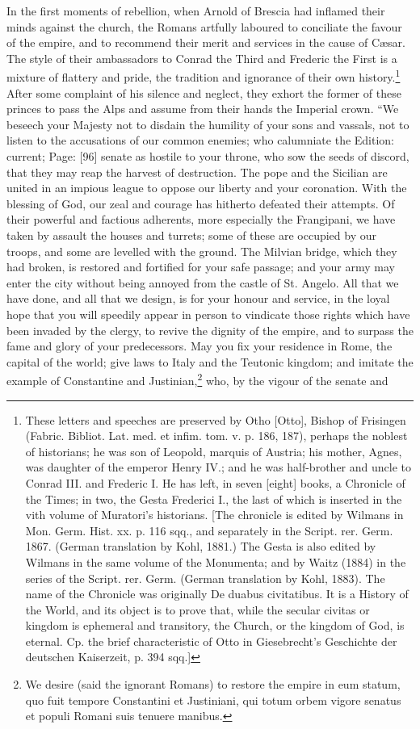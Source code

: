 In the first moments of rebellion, when Arnold of Brescia had inflamed their minds against the church, the Romans artfully laboured to conciliate the favour of the empire, and to recommend their merit and services in the cause of Cæsar. The style of their ambassadors to Conrad the Third and Frederic the First is a mixture of flattery and pride, the tradition and ignorance of their own history.\footnote{These letters and speeches are preserved by Otho [Otto], Bishop of Frisingen (Fabric. Bibliot. Lat. med. et infim. tom. v. p. 186, 187), perhaps the noblest of historians; he was son of Leopold, marquis of Austria; his mother, Agnes, was daughter of the emperor Henry IV.; and he was half-brother and uncle to Conrad III. and Frederic I. He has left, in seven [eight] books, a Chronicle of the Times; in two, the Gesta Frederici I., the last of which is inserted in the vith volume of Muratori\texthebrew{}’s historians. [The chronicle is edited by Wilmans in Mon. Germ. Hist. xx. p. 116 sqq., and separately in the Script. rer. Germ. 1867. (German translation by Kohl, 1881.) The Gesta is also edited by Wilmans in the same volume of the Monumenta; and by Waitz (1884) in the series of the Script. rer. Germ. (German translation by Kohl, 1883). The name of the Chronicle was originally De duabus civitatibus. It is a History of the World, and its object is to prove that, while the secular civitas or kingdom is ephemeral and transitory, the Church, or the kingdom of God, is eternal. Cp. the brief characteristic of Otto in Giesebrecht\texthebrew{}’s Geschichte der deutschen Kaiserzeit, p. 394 sqq.]} After some complaint of his silence and neglect, they exhort the former of these princes to pass the Alps and assume from their hands the Imperial crown. \texthebrew{“}We beseech your Majesty not to disdain the humility of your sons and vassals, not to listen to the accusations of our common enemies; who calumniate the Edition: current; Page: [96] senate as hostile to your throne, who sow the seeds of discord, that they may reap the harvest of destruction. The pope and the Sicilian are united in an impious league to oppose our liberty and your coronation. With the blessing of God, our zeal and courage has hitherto defeated their attempts. Of their powerful and factious adherents, more especially the Frangipani, we have taken by assault the houses and turrets; some of these are occupied by our troops, and some are levelled with the ground. The Milvian bridge, which they had broken, is restored and fortified for your safe passage; and your army may enter the city without being annoyed from the castle of St. Angelo. All that we have done, and all that we design, is for your honour and service, in the loyal hope that you will speedily appear in person to vindicate those rights which have been invaded by the clergy, to revive the dignity of the empire, and to surpass the fame and glory of your predecessors. May you fix your residence in Rome, the capital of the world; give laws to Italy and the Teutonic kingdom; and imitate the example of Constantine and Justinian,\footnote{We desire (said the ignorant Romans) to restore the empire in eum statum, quo fuit tempore Constantini et Justiniani, qui totum orbem vigore senatus et populi Romani suis tenuere manibus.} who, by the vigour of the senate and 